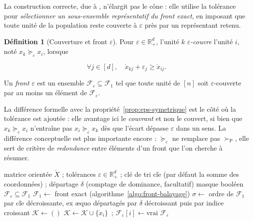 \documentclass[11pt,a4paper]{article}
\theoremstyle{definition}
\newtheorem{definition}{Définition}[section]
\theoremstyle{remark}
\newcommand{\R}{\mathbb{R}}
\newcommand{\pareto}{\succ_{\mathrm{P}}}
\newcommand{\Xor}{\mathring{X}}
\begin{document}
\bigskip

La construction correcte, due à \citet{laumanns2002}, n'élargit pas le cône : elle
utilise la tolérance pour \emph{sélectionner un sous-ensemble représentatif du front
exact}, en imposant que toute unité de la population reste couverte à $\varepsilon$ près
par un représentant retenu.

\medskip

\begin{definition}[Couverture et front $\varepsilon$]
  \label{def:front-eps}
  Pour $\varepsilon \in \R_+^d$, l'unité $k$ \emph{$\varepsilon$-couvre} l'unité $i$,
  noté $x_k \succeq_\varepsilon x_i$, lorsque

  \medskip

  \[
    \forall j \in [d], \quad \mathring{x}_{kj} + \varepsilon_j \ge \mathring{x}_{ij}.
  \]

  \bigskip

  Un \emph{front $\varepsilon$} est un ensemble
  $\mathcal{F}_\varepsilon \subseteq \mathcal{F}_1$ tel que toute unité de $[n]$ soit
  $\varepsilon$-couverte par au moins un élément de $\mathcal{F}_\varepsilon$.
\end{definition}

\bigskip

La différence formelle avec la propriété~\ref{prop:eps-symetrique} est le côté où la
tolérance est ajoutée : elle avantage ici le \emph{couvrant} et non le couvert, si bien
que $x_k \succeq_\varepsilon x_i$ n'entraîne pas $x_i \succeq_\varepsilon x_k$ dès que
l'écart dépasse $\varepsilon$ dans un sens. La différence conceptuelle est plus
importante encore : $\succeq_\varepsilon$ ne remplace pas $\pareto$, elle sert de critère
de \emph{redondance} entre éléments d'un front que l'on cherche à résumer.

\medskip

\begin{algorithm}[htbp]
  \caption{Front $\varepsilon$ glouton \citep{laumanns2002}}
  \label{algo:eps-front}
  \begin{algorithmic}[1]
    \Require matrice orientée $\Xor$ ; tolérances $\varepsilon \in \R_+^d$ ; clé de tri
      $\mathrm{cl\acute{e}}$ (par défaut la somme des coordonnées) ; départage
      $\delta$ (comptage de dominance, facultatif)
    \Ensure masque booléen $\mathcal{F}_\varepsilon \subseteq \mathcal{F}_1$
    \State $\mathcal{F}_1 \gets$ front exact (algorithme~\ref{algo:front-balayage})
    \State $\sigma \gets$ ordre de $\mathcal{F}_1$ par $\mathrm{cl\acute{e}}$
      décroissante, ex \ae quo départagés par $\delta$ décroissant puis par indice
      croissant
    \State $\mathcal{K} \gets ()$ 
        \State $\mathcal{K} \gets \mathcal{K} \cup \{\mathring{x}_i\}$~;\quad
          $\mathcal{F}_\varepsilon[i] \gets \text{vrai}$
      \EndIf
    \EndFor
    \State \Return $\mathcal{F}_\varepsilon$
  \end{algorithmic}
\end{algorithm}
\end{document}
